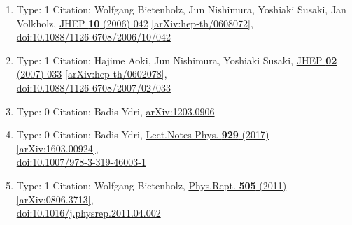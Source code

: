 \documentclass[a4paper,10pt]{article}
\begin{document}
\begin{enumerate}
\begin{enumerate}
  \item Type: 1 Citation: Wolfgang Bietenholz, Jun Nishimura, Yoshiaki Susaki, Jan Volkholz, \href{https://www.doi.org/10.1088/1126-6708/2006/10/042}{JHEP {\bf 10} (2006) 042}  \href{https://arxiv.org/abs/hep-th/0608072}{[arXiv:hep-th/0608072]},\\\href{https://www.doi.org/10.1088/1126-6708/2006/10/042}{doi:10.1088/1126-6708/2006/10/042}
  \item Type: 1 Citation: Hajime Aoki, Jun Nishimura, Yoshiaki Susaki, \href{https://www.doi.org/10.1088/1126-6708/2007/02/033}{JHEP {\bf 02} (2007) 033}  \href{https://arxiv.org/abs/hep-th/0602078}{[arXiv:hep-th/0602078]},\\\href{https://www.doi.org/10.1088/1126-6708/2007/02/033}{doi:10.1088/1126-6708/2007/02/033}
  \item Type: 0 Citation: Badis Ydri, \href{https://arxiv.org/abs/1203.0906}{arXiv:1203.0906}
  \item Type: 0 Citation: Badis Ydri, \href{https://www.doi.org/10.1007/978-3-319-46003-1}{Lect.Notes Phys. {\bf 929} (2017) }  \href{https://arxiv.org/abs/1603.00924}{[arXiv:1603.00924]},\\\href{https://www.doi.org/10.1007/978-3-319-46003-1}{doi:10.1007/978-3-319-46003-1}
  \item Type: 1 Citation: Wolfgang Bietenholz, \href{https://www.doi.org/10.1016/j.physrep.2011.04.002}{Phys.Rept. {\bf 505} (2011) }  \href{https://arxiv.org/abs/0806.3713}{[arXiv:0806.3713]},\\\href{https://www.doi.org/10.1016/j.physrep.2011.04.002}{doi:10.1016/j.physrep.2011.04.002}

\end{enumerate}
\end{enumerate}
\end{document}
